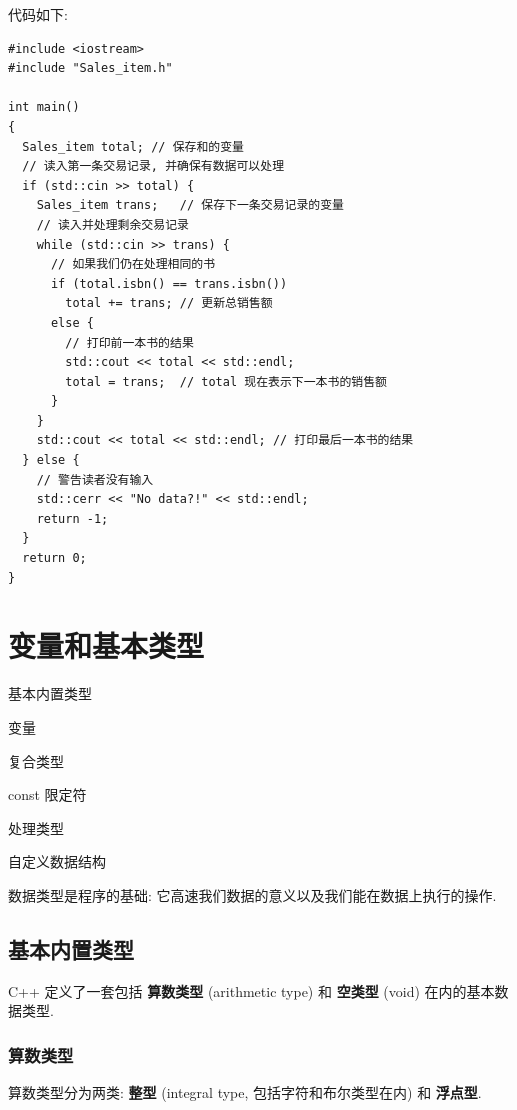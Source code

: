 \documentclass[lang=cn]{elegantbook}
\begin{document}
代码如下:

\begin{verbatim}
#include <iostream>
#include "Sales_item.h"

int main()
{
  Sales_item total; // 保存和的变量
  // 读入第一条交易记录, 并确保有数据可以处理
  if (std::cin >> total) {
    Sales_item trans;   // 保存下一条交易记录的变量
    // 读入并处理剩余交易记录
    while (std::cin >> trans) {
      // 如果我们仍在处理相同的书
      if (total.isbn() == trans.isbn())
        total += trans; // 更新总销售额
      else {
        // 打印前一本书的结果
        std::cout << total << std::endl;
        total = trans;  // total 现在表示下一本书的销售额
      }
    }
    std::cout << total << std::endl; // 打印最后一本书的结果
  } else {
    // 警告读者没有输入
    std::cerr << "No data?!" << std::endl;
    return -1;
  }
  return 0;
}
\end{verbatim}


\chapter{变量和基本类型}
\label{sec:org44dfd2a}

\begin{introduction}
  \item 基本内置类型
  \item 变量
  \item 复合类型
  \item const 限定符
  \item 处理类型
  \item 自定义数据结构
\end{introduction}


数据类型是程序的基础: 它高速我们数据的意义以及我们能在数据上执行的操作.

\section{基本内置类型}
\label{sec:orgd84f053}

C++ 定义了一套包括 \textbf{算数类型} (arithmetic type) 和 \textbf{空类型} (void) 在内的基本数
据类型.

\subsection{算数类型}
\label{sec:org258341b}

算数类型分为两类: \textbf{整型} (integral type, 包括字符和布尔类型在内) 和 \textbf{浮点型}.
\end{document}
